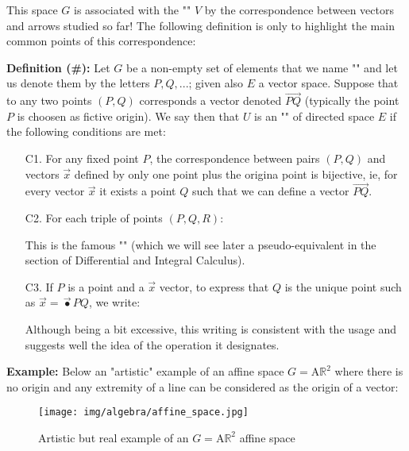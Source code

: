 	This space $G$ is associated with the "" $V$ by the correspondence between vectors and arrows studied so far! The following definition is only to highlight the main common points of this correspondence:
	
	\textbf{Definition (\#\mydef):} Let $G$ be a non-empty set of elements that we name "" and let us  denote them by the letters $P, Q, ...$; given also $E$ a vector space. Suppose that to any two points $(P, Q)$ corresponds a vector denoted $\overrightarrow{PQ}$ (typically the point $P$ is choosen as fictive origin). We say then that $U$ is an "" of directed space $E$ if the following conditions are met:
	\begin{enumerate}
		\item[C1.] For any fixed point $P$, the correspondence between pairs $(P, Q)$ and vectors $\vec{x}$ defined by only one point plus the origina point is bijective, ie, for every vector $\vec{x}$ it exists a point $Q$ such that we can define a vector $\overrightarrow{PQ}$.
		
		\item[C2.] For each triple of points $(P, Q, R)$:
		
		This is the famous "" (which we will see later a pseudo-equivalent in the section of Differential and Integral Calculus).
		
		\item[C3.] If $P$ is a point and a $\vec{x}$ vector, to express that $Q$ is the unique point such as $\vec{x}=\overrightarrow{•}{PQ}$, we write:
		
		Although being a bit excessive, this writing is consistent with the usage and suggests well the idea of the operation it designates.
	\end{enumerate}
	\begin{tcolorbox}[colframe=black,colback=white,sharp corners]
	\textbf{{\Large {}}Example:}
	Below an "artistic" example of an affine space $G=\text{A}\mathbb{R}^2$ where there is no origin and any extremity of a line can be considered as the origin of a vector:
	\begin{figure}[H]
		\centering
		\texttt{[image: img/algebra/affine\_space.jpg]}
		\caption{Artistic but real example of an $G=\text{A}\mathbb{R}^2$ affine space}
	\end{figure}
	\end{tcolorbox}
	

